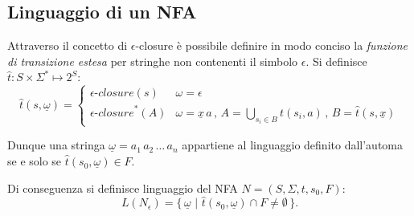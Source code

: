 \subsection{Linguaggio di un NFA}
Attraverso il concetto di $\epsilon$-closure è possibile definire in modo conciso la \emph{funzione di transizione estesa} per stringhe non contenenti il simbolo $\epsilon$. 
Si definisce $\hat t:  S \times \Sigma^* \mapsto 2^S$:
$$
\hat t(s, \underline \omega) = \begin{cases}
\mathcal{\epsilon}\textit{-closure}(s) & \omega = \epsilon \\
\mathcal{\epsilon}\textit{-closure}^*(A) & \omega = \underline x \, a \,,\, A=\displaystyle\bigcup_{s_i \in B} t(s_i, a)\,,\,B=\hat t(s, \underline x)
\end{cases}
$$

Dunque una stringa $\underline \omega = a_1\, a_2\,\dots\,a_n$ appartiene al linguaggio definito dall'automa se e solo se $\hat t(s_0, \underline \omega) \in F$.

Di conseguenza si definisce linguaggio del NFA $N = (S,\Sigma, t, s_0, F)$:
$$
L(N_\epsilon) = \{\,\underline \omega\,\,|\,\,\hat t(s_0, \underline \omega) \cap F \ne \emptyset\,\}.
$$


\newpage
